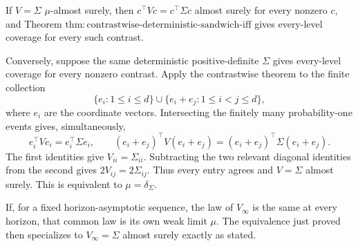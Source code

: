 If \(V=\Sigma\) \(\mu\)-almost surely, then \(c^\top Vc=c^\top\Sigma c\) almost surely for every nonzero \(c\), and Theorem \(\mathrm{thm:contrastwise\text{-}deterministic\text{-}sandwich\text{-}iff}\) gives every-level coverage for every such contrast.

Conversely, suppose the same deterministic positive-definite \(\Sigma\) gives every-level coverage for every nonzero contrast.  Apply the contrastwise theorem to the finite collection
\[
 \{e_i:1\le i\le d\}\cup\{e_i+e_j:1\le i<j\le d\},
\]
where \(e_i\) are the coordinate vectors.  Intersecting the finitely many probability-one events gives, simultaneously,
\[
 e_i^\top Ve_i=e_i^\top\Sigma e_i,
 \qquad
 (e_i+e_j)^\top V(e_i+e_j)=(e_i+e_j)^\top\Sigma(e_i+e_j).
\]
The first identities give \(V_{ii}=\Sigma_{ii}\).  Subtracting the two relevant diagonal identities from the second gives \(2V_{ij}=2\Sigma_{ij}\).  Thus every entry agrees and \(V=\Sigma\) almost surely.  This is equivalent to \(\mu=\delta_\Sigma\).

If, for a fixed horizon-asymptotic sequence, the law of \(V_\infty\) is the same at every horizon, that common law is its own weak limit \(\mu\).  The equivalence just proved then specializes to \(V_\infty=\Sigma\) almost surely exactly as stated.